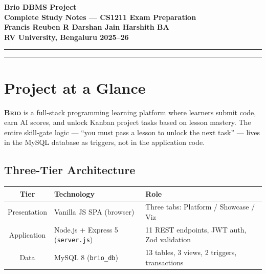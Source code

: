 \documentclass[11pt,a4paper]{article}
\newcommand{\brio}{\textsc{Brio}}
\newcommand{\T}[1]{\texttt{#1}}          %
\begin{document}

{%
\thispagestyle{empty}
\centering\Large\bfseries\color{darkblue}
Brio DBMS Project\\[4pt]
\normalsize\mdseries\color{black}
Complete Study Notes --- CS1211 Exam Preparation\\[2pt]
{\small Francis Reuben R \textbullet{} Darshan Jain \textbullet{} Harshith BA}\\[2pt]
{\small RV University, Bengaluru \textbullet{} 2025--26}
\par
}

\rule{\linewidth}{1pt}

\tableofcontents

\rule{\linewidth}{0.5pt}

\newpage

\section{Project at a Glance}

\begin{keybox}
\textbf{\brio} is a full-stack programming learning platform where learners submit code,
earn AI scores, and unlock Kanban project tasks based on lesson mastery. The entire
skill-gate logic --- ``you must pass a lesson to unlock the next task'' --- lives in
the MySQL database as triggers, not in the application code.
\end{keybox}

\subsection{Three-Tier Architecture}

\begin{center}
\renewcommand{\arraystretch}{1.3}
\begin{tabular}{@{}cll@{}}
\toprule
\textbf{Tier} & \textbf{Technology} & \textbf{Role} \\
\midrule
Presentation & Vanilla JS SPA (browser) & Three tabs: Platform / Showcase / Viz \\
Application  & Node.js + Express 5 (\T{server.js}) & 11 REST endpoints, JWT auth, Zod validation \\
Data         & MySQL 8 (\T{brio\_db}) & 13 tables, 3 views, 2 triggers, transactions \\
\bottomrule
\end{tabular}
\end{center}
\end{document}
